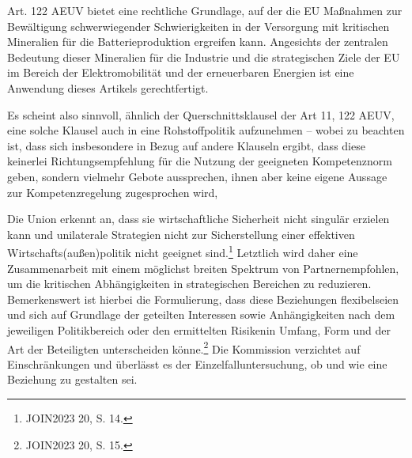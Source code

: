 \documentclass[12pt,a4paper,oneside]{book} %
\begin{document}
Art. 122 AEUV bietet eine rechtliche Grundlage, auf der die EU Maßnahmen zur Bewältigung schwerwiegender Schwierigkeiten in der Versorgung mit kritischen Mineralien für die Batterieproduktion ergreifen kann. Angesichts der zentralen Bedeutung dieser Mineralien für die Industrie und die strategischen Ziele der EU im Bereich der Elektromobilität und der erneuerbaren Energien ist eine Anwendung dieses Artikels gerechtfertigt.
	
Es scheint also sinnvoll, ähnlich der Querschnittsklausel der Art 11, 122 AEUV, eine solche Klausel auch in eine Rohstoffpolitik aufzunehmen -- wobei zu beachten ist, dass sich insbesondere in Bezug auf andere Klauseln ergibt, dass diese keinerlei Richtungsempfehlung für die Nutzung der geeigneten Kompetenznorm geben, sondern vielmehr Gebote aussprechen, ihnen aber keine eigene Aussage zur Kompetenzregelung zugesprochen wird,\autocite[39]{callies_umweltrecht_2022}

Die Union erkennt an, dass sie wirtschaftliche Sicherheit nicht singulär erzielen kann und unilaterale Strategien nicht zur Sicherstellung einer effektiven Wirtschafts(außen)politik nicht geeignet sind.\footnote{JOIN2023 20, S. 14.} Letztlich wird daher eine \glqq Zusammenarbeit mit einem möglichst breiten Spektrum von Partnern\grqq empfohlen, um die kritischen Abhängigkeiten in strategischen Bereichen zu reduzieren. Bemerkenswert ist hierbei die Formulierung, dass diese Beziehungen \glqq flexibel\grqq seien und sich auf Grundlage der geteilten Interessen sowie Anhängigkeiten \glqq nach dem jeweiligen Politikbereich oder den ermittelten Risiken\grqq in Umfang, Form und der Art der Beteiligten unterscheiden könne.\footnote{JOIN2023 20, S. 15.} Die Kommission verzichtet auf Einschränkungen und überlässt es der Einzelfalluntersuchung, ob und wie eine Beziehung zu gestalten sei.
\end{document}
